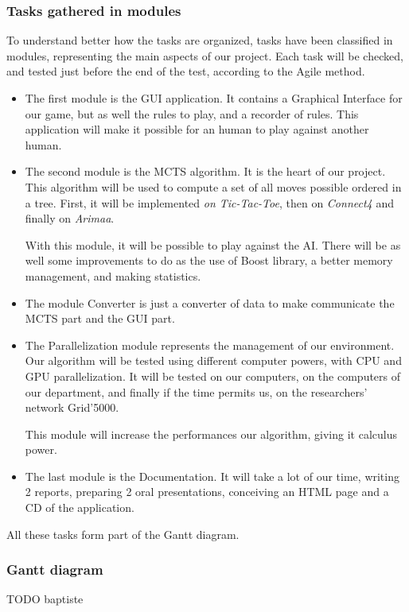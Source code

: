 \subsubsection{Tasks gathered in modules}

To understand better how the tasks are organized, tasks have been classified in modules, representing the main aspects of our project. Each task will be checked, and tested just before the end of the test, according to the Agile method.

\begin{itemize}
  \item The first module is the GUI application. It contains a Graphical Interface for our game, but as well the rules to play, and a recorder of rules. 
This application will make it possible for an human to play against another human.
  \item The second module is the MCTS algorithm. It is the heart of our project. This algorithm will be used to compute a set of all moves possible ordered in a tree. First, it will be implemented \textit{on Tic-Tac-Toe}, then on \textit{Connect4} and finally on \textit{Arimaa}. 

With this module, it will be possible to play against the AI.
There will be as well some improvements to do as the use of Boost library, a better memory management, and making statistics.
  \item The module Converter is just a converter of data to make communicate the MCTS part and the GUI part.
  \item The Parallelization module represents the management of our environment. Our algorithm will be tested using different computer powers, with CPU and GPU parallelization. It will be tested on our computers, on the computers of our department, and finally if the time permits us, on the researchers' network Grid'5000. 

This module will increase the performances our algorithm, giving it calculus power.
  \item The last module is the Documentation. It will take a lot of our time, writing 2 reports, preparing 2 oral presentations, conceiving an HTML page and a CD of the application.
\end{itemize}
All these tasks form part of the Gantt diagram.

\subsubsection{Gantt diagram}
TODO baptiste